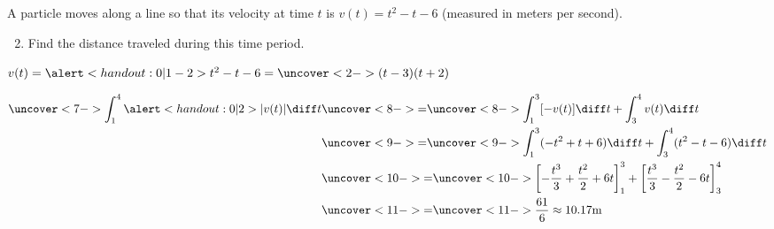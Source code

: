 \begin{frame}[t]
\begin{example}[Example 6, p. 328]
A particle moves along a line so that its velocity at time $t$ is \alert<handout:0| 2>{$v(t) = t^2 - t - 6$} (measured in meters per second).
\begin{enumerate}
\setcounter{enumi}{1}
\item  Find the distance traveled during this time period.
\end{enumerate}
$v(t) = \alert<handout:0| 1-2>{t^2 - t - 6 = \uncover<2->{(t-3)(t+2)}}$ %
%

%
\abovedisplayskip=0pt
\belowdisplayskip=0pt
\begin{align*}
\uncover<7->{ \int_1^4 \alert<handout:0| 2>{|v(t)|} \diff t }%
& \uncover<8->{=}  \uncover<8->{ \int_1^3 [-v(t)]\diff t + \int_3^4 v(t) \diff t}\\%
& \uncover<9->{=}  \uncover<9->{ \int_1^3 (-t^2 + t + 6 )\diff t + \int_3^4 (t^2 - t - 6) \diff t}\\%
& \uncover<10->{=}  \uncover<10->{ \left[ -\frac{t^3}{3} + \frac{t^2}{2} + 6t\right]_1^3 + \left[ \frac{t^3}{3} - \frac{t^2}{2} - 6t\right]_3^4}\\%
& \uncover<11->{=}  \uncover<11->{ \frac{61}{6} \approx 10.17\text{m}} 
\end{align*}
\end{example}
\end{frame}
